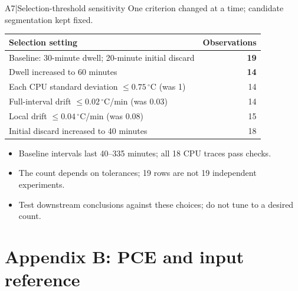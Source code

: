 \begin{frame}[more-space,label=backup-A7]{A7\enspace|\enspace Selection-threshold sensitivity}
  \small One criterion changed at a time; candidate segmentation kept fixed.
  \par\medskip
  {\renewcommand{\arraystretch}{1.35}
  \begin{tabular*}{\textwidth}{@{\extracolsep{\fill}}lr@{}}
    \toprule
    \textbf{Selection setting} & \textbf{Observations}\\
    \midrule
    Baseline: 30-minute dwell; 20-minute initial discard & \textbf{19}\\
    Dwell increased to 60 minutes & \textbf{14}\\
    Each CPU standard deviation $\leq0.75\,{}^\circ$C (was 1) & 14\\
    Full-interval drift $\leq0.02\,{}^\circ$C/min (was 0.03) & 14\\
    Local drift $\leq0.04\,{}^\circ$C/min (was 0.08) & 15\\
    Initial discard increased to 40 minutes & 18\\
    \bottomrule
  \end{tabular*}}
  \medskip
  \begin{itemize}
    \item Baseline intervals last 40--335 minutes; all 18 CPU traces pass checks.
    \item The count depends on tolerances; 19 rows are not 19 independent experiments.
    \item Test downstream conclusions against these choices; do not tune to a desired count.
  \end{itemize}
\end{frame}

\section{Appendix B: PCE and input reference}

\renewcommand{\backupcode}{B1}

